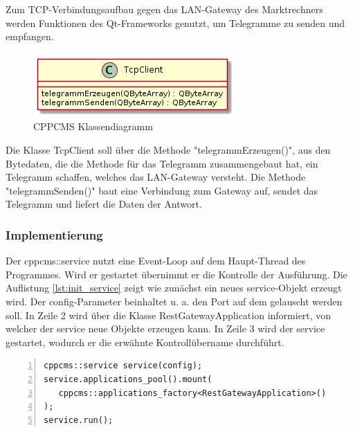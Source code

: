 \documentclass{article}
\begin{document}
Zum TCP-Verbindungsaufbau gegen das LAN-Gateway des Marktrechners werden Funktionen des Qt-Frameworks genutzt, um Telegramme zu senden und empfangen.

\begin{figure}[h]
\centering
\includegraphics[scale=0.5]{praktikumsbericht_001.png}
\caption{CPPCMS Klassendiagramm}
\label{fig:cppcms_class_diagram}
\end{figure}

Die Klasse TcpClient soll über die Methode "telegrammErzeugen()", aus den Bytedaten, die die Methode für das Telegramm zusammengebaut hat, ein Telegramm schaffen, welches das LAN-Gateway versteht. Die Methode "telegrammSenden()" baut eine Verbindung zum Gateway auf, sendet das Telegramm und liefert die Daten der Antwort.

\subsubsection{Implementierung}

Der cppcms::service nutzt eine Event-Loop auf dem Haupt-Thread des Programmes. Wird er gestartet übernimmt er die Kontrolle der Ausführung. Die Auflistung \ref{lst:init_service} zeigt wie zunächst ein neues service-Objekt erzeugt wird. Der config-Parameter beinhaltet u. a. den Port auf dem gelauscht werden soll. In Zeile 2 wird über die Klasse RestGatewayApplication informiert, von welcher der service neue Objekte erzeugen kann. In Zeile 3 wird der service gestartet, wodurch er die erwähnte Kontrollübername durchführt.

\lstset{language=C++}
\begin{lstlisting}[caption=Service initialisieren, label=lst:init_service, frame=single, numbers=left, tabsize=3, captionpos=b]
cppcms::service service(config);
service.applications_pool().mount(
   cppcms::applications_factory<RestGatewayApplication>()
);
service.run();
\end{lstlisting}
\end{document}
